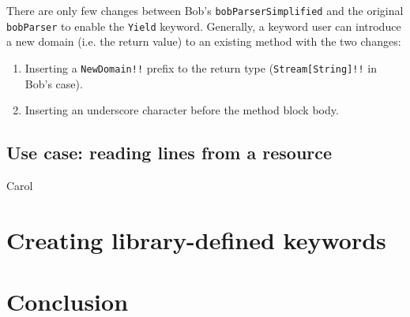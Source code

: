 There are only few changes between Bob's \lstinline{bobParserSimplified} and the original \lstinline{bobParser} to enable the \lstinline{Yield} keyword. Generally, a keyword user can introduce a new domain (i.e. the return value) to an existing method with the two changes:

\begin{enumerate}
  \item Inserting a \lstinline{NewDomain!!} prefix to the return type (\lstinline{Stream[String]!!} in Bob's case).
  \item Inserting an underscore character before the method block body.
\end{enumerate}

\subsection{Use case: reading lines from a resource}

Carol

\section{Creating library-defined keywords}





\section{Conclusion}
\label{conclusion}


\clearpage
\appendix

\printglossary

\begin{acks}
\end{acks}


